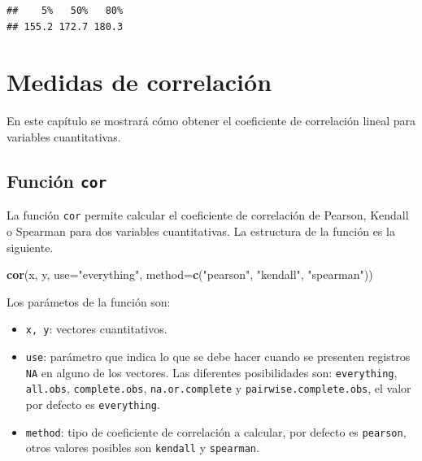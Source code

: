 \documentclass[10pt,]{krantz}
\makeatletter
\newenvironment{Shaded}{\begin{snugshade}}{\end{snugshade}}
\newcommand{\KeywordTok}[1]{\textcolor[rgb]{0.13,0.29,0.53}{\textbf{{#1}}}}
\newcommand{\DataTypeTok}[1]{\textcolor[rgb]{0.13,0.29,0.53}{{#1}}}
\newcommand{\StringTok}[1]{\textcolor[rgb]{0.31,0.60,0.02}{{#1}}}
\newcommand{\NormalTok}[1]{{#1}}
\providecommand{\tightlist}{%
  \setlength{\itemsep}{0pt}\setlength{\parskip}{0pt}}
\newenvironment{kframe}{%
\medskip{}
\setlength{\fboxsep}{.8em}
 \def\at@end@of@kframe{}%
 \ifinner\ifhmode%
  \def\at@end@of@kframe{\end{minipage}}%
  \begin{minipage}{\columnwidth}%
 \fi\fi%
 \def\FrameCommand##1{\hskip\@totalleftmargin \hskip-\fboxsep
 \colorbox{shadecolor}{##1}\hskip-\fboxsep
     \hskip-\linewidth \hskip-\@totalleftmargin \hskip\columnwidth}%
 \MakeFramed {\advance\hsize-\width
   \@totalleftmargin\z@ \linewidth\hsize
   \@setminipage}}%
 {\par\unskip\endMakeFramed%
 \at@end@of@kframe}
\renewenvironment{Shaded}{\begin{kframe}}{\end{kframe}}
\makeatother
\begin{document}
\begin{verbatim}
##    5%   50%   80% 
## 155.2 172.7 180.3
\end{verbatim}

\chapter{\texorpdfstring{Medidas de correlación
\label{correl}}{Medidas de correlación }}\label{medidas-de-correlacion}

En este capítulo se mostrará cómo obtener el coeficiente de correlación
lineal para variables cuantitativas.

\section{\texorpdfstring{Función \texttt{cor} 
}{Función cor  }}\label{funcion-cor}

La función \texttt{cor} permite calcular el coeficiente de correlación
de Pearson, Kendall o Spearman para dos variables cuantitativas. La
estructura de la función es la siguiente.

\begin{Shaded}
\begin{Highlighting}[]
\KeywordTok{cor}\NormalTok{(x, y, }\DataTypeTok{use=}\StringTok{"everything"}\NormalTok{,}
    \DataTypeTok{method=}\KeywordTok{c}\NormalTok{(}\StringTok{"pearson"}\NormalTok{, }\StringTok{"kendall"}\NormalTok{, }\StringTok{"spearman"}\NormalTok{))}
\end{Highlighting}
\end{Shaded}

Los parámetos de la función son:

\begin{itemize}
\tightlist
\item
  \texttt{x,\ y}: vectores cuantitativos.
\item
  \texttt{use}: parámetro que indica lo que se debe hacer cuando se
  presenten registros \texttt{NA} en alguno de los vectores. Las
  diferentes posibilidades son: \texttt{everything}, \texttt{all.obs},
  \texttt{complete.obs}, \texttt{na.or.complete} y
  \texttt{pairwise.complete.obs}, el valor por defecto es
  \texttt{everything}.
\item
  \texttt{method}: tipo de coeficiente de correlación a calcular, por
  defecto es \texttt{pearson}, otros valores posibles son
  \texttt{kendall} y \texttt{spearman}.
\end{itemize}
\end{document}
